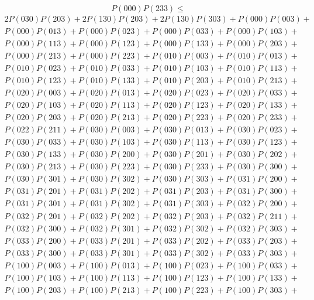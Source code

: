 \documentclass{article}
\begin{document}
    \[ P(000)P(233) \leq \]
    \begin{gather*}
        2P(030)P(203) + 2P(130)P(203) + 2P(130)P(303) + P(000)P(003) + \\
        P(000)P(013) + P(000)P(023) + P(000)P(033) + P(000)P(103) + \\
        P(000)P(113) + P(000)P(123) + P(000)P(133) + P(000)P(203) + \\
        P(000)P(213) + P(000)P(223) + P(010)P(003) + P(010)P(013) + \\
        P(010)P(023) + P(010)P(033) + P(010)P(103) + P(010)P(113) + \\
        P(010)P(123) + P(010)P(133) + P(010)P(203) + P(010)P(213) + \\
        P(020)P(003) + P(020)P(013) + P(020)P(023) + P(020)P(033) + \\
        P(020)P(103) + P(020)P(113) + P(020)P(123) + P(020)P(133) + \\
        P(020)P(203) + P(020)P(213) + P(020)P(223) + P(020)P(233) + \\
        P(022)P(211) + P(030)P(003) + P(030)P(013) + P(030)P(023) + \\
        P(030)P(033) + P(030)P(103) + P(030)P(113) + P(030)P(123) + \\
        P(030)P(133) + P(030)P(200) + P(030)P(201) + P(030)P(202) + \\
        P(030)P(213) + P(030)P(223) + P(030)P(233) + P(030)P(300) + \\
        P(030)P(301) + P(030)P(302) + P(030)P(303) + P(031)P(200) + \\
        P(031)P(201) + P(031)P(202) + P(031)P(203) + P(031)P(300) + \\
        P(031)P(301) + P(031)P(302) + P(031)P(303) + P(032)P(200) + \\
        P(032)P(201) + P(032)P(202) + P(032)P(203) + P(032)P(211) + \\
        P(032)P(300) + P(032)P(301) + P(032)P(302) + P(032)P(303) + \\
        P(033)P(200) + P(033)P(201) + P(033)P(202) + P(033)P(203) + \\
        P(033)P(300) + P(033)P(301) + P(033)P(302) + P(033)P(303) + \\
        P(100)P(003) + P(100)P(013) + P(100)P(023) + P(100)P(033) + \\
        P(100)P(103) + P(100)P(113) + P(100)P(123) + P(100)P(133) + \\
        P(100)P(203) + P(100)P(213) + P(100)P(223) + P(100)P(303) + \\

\end{gather*}
\end{document}

